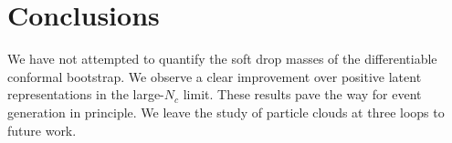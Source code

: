 \section{Conclusions}\label{sec:conclusions}

We have not attempted to quantify the soft drop masses of the
differentiable conformal bootstrap. We observe a clear improvement over
positive latent representations in the large-$N_c$ limit. These results
pave the way for event generation in principle. We leave the study of
particle clouds at three loops to future work.

